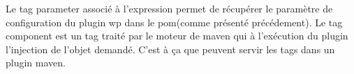 Le tag parameter associé à l'expression permet de récupérer le paramètre de 
configuration du plugin wp dans le pom(comme présenté précédement). 
Le tag component est un tag traité par le moteur de maven qui à l'exécution
du plugin l'injection de l'objet demandé. C'est à ça que peuvent servir les 
tags dans un plugin maven. 





